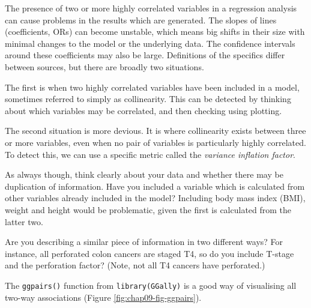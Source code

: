 \documentclass[
  12pt,
  krantz2]{krantz}
\makeatletter
\newenvironment{Shaded}{\begin{snugshade}}{\end{snugshade}}
\newcommand{\CommentTok}[1]{\textcolor[rgb]{0.56,0.35,0.01}{\textit{#1}}}
\newcommand{\DataTypeTok}[1]{\textcolor[rgb]{0.13,0.29,0.53}{#1}}
\newcommand{\KeywordTok}[1]{\textcolor[rgb]{0.13,0.29,0.53}{\textbf{#1}}}
\newcommand{\NormalTok}[1]{#1}
\newcommand{\OperatorTok}[1]{\textcolor[rgb]{0.81,0.36,0.00}{\textbf{#1}}}
\newcommand{\StringTok}[1]{\textcolor[rgb]{0.31,0.60,0.02}{#1}}
\newenvironment{kframe}{%
\medskip{}
\setlength{\fboxsep}{.8em}
 \def\at@end@of@kframe{}%
 \ifinner\ifhmode%
  \def\at@end@of@kframe{\end{minipage}}%
  \begin{minipage}{\columnwidth}%
 \fi\fi%
 \def\FrameCommand##1{\hskip\@totalleftmargin \hskip-\fboxsep
 \colorbox{shadecolor}{##1}\hskip-\fboxsep
     \hskip-\linewidth \hskip-\@totalleftmargin \hskip\columnwidth}%
 \MakeFramed {\advance\hsize-\width
   \@totalleftmargin\z@ \linewidth\hsize
   \@setminipage}}%
 {\par\unskip\endMakeFramed%
 \at@end@of@kframe}
\renewenvironment{Shaded}{\begin{kframe}}{\end{kframe}}
\makeatother
\begin{document}
The presence of two or more highly correlated variables in a regression analysis can cause problems in the results which are generated.
The slopes of lines (coefficients, ORs) can become unstable, which means big shifts in their size with minimal changes to the model or the underlying data.
The confidence intervals around these coefficients may also be large.
Definitions of the specifics differ between sources, but there are broadly two situations.

The first is when two highly correlated variables have been included in a model, sometimes referred to simply as collinearity.
This can be detected by thinking about which variables may be correlated, and then checking using plotting.

The second situation is more devious.
It is where collinearity exists between three or more variables, even when no pair of variables is particularly highly correlated.
To detect this, we can use a specific metric called the \emph{variance inflation factor}.

As always though, think clearly about your data and whether there may be duplication of information.
Have you included a variable which is calculated from other variables already included in the model?
Including body mass index (BMI), weight and height would be problematic, given the first is calculated from the latter two.

Are you describing a similar piece of information in two different ways?
For instance, all perforated colon cancers are staged T4, so do you include T-stage and the perforation factor?
(Note, not all T4 cancers have perforated.)

The \texttt{ggpairs()} function from \texttt{library(GGally)} is a good way of visualising all two-way associations (Figure \ref{fig:chap09-fig-ggpairs}).

\begin{Shaded}
\end{Shaded}
\end{document}
